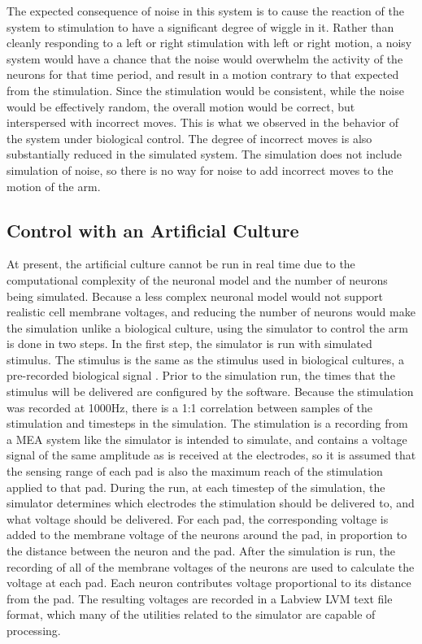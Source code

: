 \documentclass[letterpaper]{article}
\begin{document}
The expected consequence of noise in this system is to cause the reaction of the system to stimulation to have a significant degree of wiggle in it. 
Rather than cleanly responding to a left or right stimulation with left or right motion, a noisy system would have a chance that the noise would overwhelm the activity of the neurons for that time period, and result in a motion contrary to that expected from the stimulation. 
Since the stimulation would be consistent, while the noise would be effectively random, the overall motion would be correct, but interspersed with incorrect moves. 
This is what we observed in the behavior of the system under biological control.
The degree of incorrect moves is also substantially reduced in the simulated system.
The simulation does not include simulation of noise, so there is no way for noise to add incorrect moves to the motion of the arm. 

\subsection{Control with an Artificial Culture}

At present, the artificial culture cannot be run in real time due to the computational complexity of the neuronal model and the number of neurons being simulated. 
Because a less complex neuronal model would not support realistic cell membrane voltages, and reducing the number of neurons would make the simulation unlike a biological culture, using the simulator to control the arm is done in two steps. 
In the first step, the simulator is run with simulated stimulus. 
The stimulus is the same as the stimulus used in biological cultures, a pre-recorded biological signal \cite{zemianek2012stimulation}. 
Prior to the simulation run, the times that the stimulus will be delivered are configured by the software. 
Because the stimulation was recorded at 1000Hz, there is a 1:1 correlation between samples of the stimulation and timesteps in the simulation. 
The stimulation is a recording from a MEA system like the simulator is intended to simulate, and contains a voltage signal of the same amplitude as is received at the electrodes, so it is assumed that the sensing range of each pad is also the maximum reach of the stimulation applied to that pad. 
During the run, at each timestep of the simulation, the simulator determines which electrodes the stimulation should be delivered to, and what voltage should be delivered.
For each pad, the corresponding voltage is added to the membrane voltage of the neurons around the pad, in proportion to the distance between the neuron and the pad. 
After the simulation is run, the recording of all of the membrane voltages of the neurons are used to calculate the voltage at each pad. 
Each neuron contributes voltage proportional to its distance from the pad. 
The resulting voltages are recorded in a Labview LVM text file format, which many of the utilities related to the simulator are capable of processing. 
\end{document}
